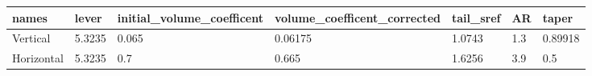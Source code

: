 \begin{tabular}{lllllll}
names & lever & initial_volume_coefficent & volume_coefficent_corrected & tail_sref & AR & taper \\ 
\hline 
Vertical & 5.3235 & 0.065 & 0.06175 & 1.0743 & 1.3 & 0.89918 \\ 
Horizontal & 5.3235 & 0.7 & 0.665 & 1.6256 & 3.9 & 0.5 \\ 
\hline 
\end{tabular}
